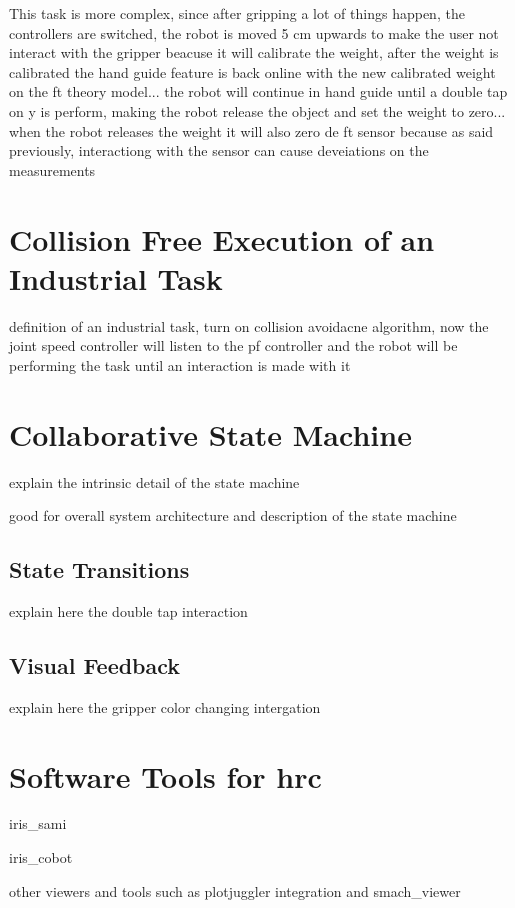 \par This task is more complex, since after gripping a lot of things happen, the controllers are switched, the robot is moved 5 cm upwards to make the user not interact with the gripper beacuse it will calibrate the weight, after the weight is calibrated the hand guide feature is back online with the new calibrated weight on the ft theory model... the robot will continue in hand guide until a double tap on y is perform, making the robot release the object and set the weight to zero... when the robot releases the weight it will also zero de ft sensor because as said previously, interactiong with the sensor can cause deveiations on the measurements

\section{Collision Free Execution of an Industrial Task}

\par definition of an industrial task, turn on collision avoidacne algorithm, now the joint speed controller will listen to the pf controller and the robot will be performing the task until an interaction is made with it

\section{Collaborative State Machine}

\par explain the intrinsic detail of the state machine
\par good for overall system architecture and description of the state machine


\subsection{State Transitions}

\par explain here the double tap interaction

\subsection{Visual Feedback}

\par explain here the gripper color changing intergation


\section{Software Tools for \acs{hrc}}
\label{sec:tools-hrc}

\par iris\_sami
\par iris\_cobot
\par other viewers and tools such as plotjuggler integration and smach\_viewer
